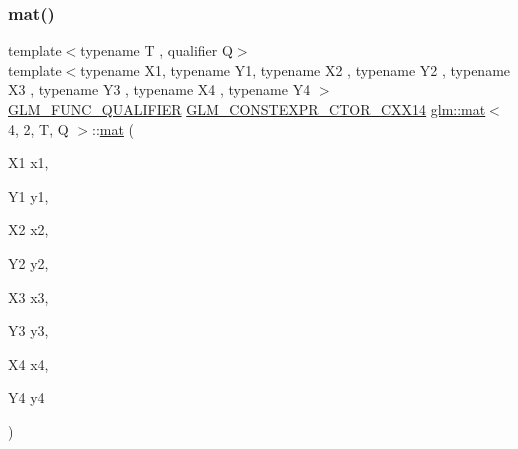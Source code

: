 \subsubsection{\texorpdfstring{mat()}{mat()}\hspace{0.1cm}{\footnotesize\ttfamily [19/21]}}
{\footnotesize\ttfamily template$<$typename T , qualifier Q$>$ \\
template$<$typename X1, typename Y1, typename X2 , typename Y2 , typename X3 , typename Y3 , typename X4 , typename Y4 $>$ \\
\mbox{\hyperlink{setup_8hpp_a33fdea6f91c5f834105f7415e2a64407}{G\+L\+M\+\_\+\+F\+U\+N\+C\+\_\+\+Q\+U\+A\+L\+I\+F\+I\+ER}} \mbox{\hyperlink{setup_8hpp_a0900f9145e68bf6061b6f5e7be3fa751}{G\+L\+M\+\_\+\+C\+O\+N\+S\+T\+E\+X\+P\+R\+\_\+\+C\+T\+O\+R\+\_\+\+C\+X\+X14}} \mbox{\hyperlink{structglm_1_1mat}{glm\+::mat}}$<$ 4, 2, T, Q $>$\+::\mbox{\hyperlink{structglm_1_1mat}{mat}} (\begin{DoxyParamCaption}\item[{X1}]{x1,  }\item[{Y1}]{y1,  }\item[{X2}]{x2,  }\item[{Y2}]{y2,  }\item[{X3}]{x3,  }\item[{Y3}]{y3,  }\item[{X4}]{x4,  }\item[{Y4}]{y4 }\end{DoxyParamCaption})}

\mbox{\label{structglm_1_1mat_3_014_00_012_00_01_t_00_01_q_01_4_ae4f422e3a1f8e3fa42d2782ec06a8200}} 
